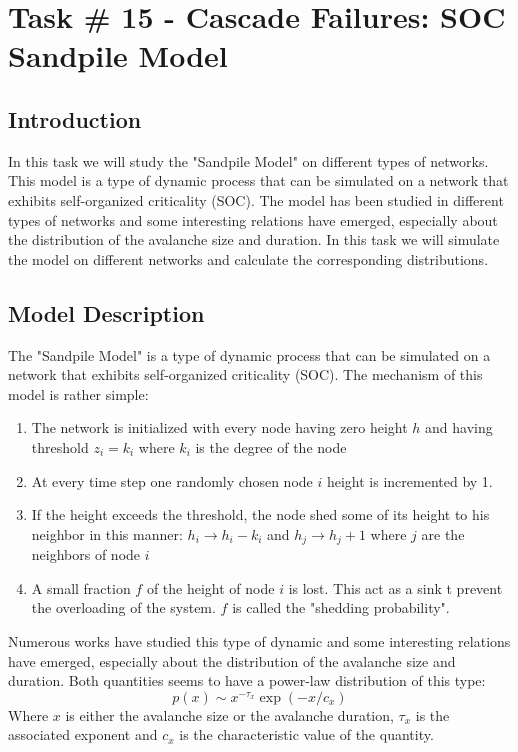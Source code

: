 \chapter{Task \# 15 - Cascade Failures: SOC Sandpile Model}

\section{Introduction}
In this task we will study the "Sandpile Model" on different types of networks. This model is a type of dynamic process that can be simulated on a network that exhibits self-organized criticality (SOC). The model has been studied in different types of networks and some interesting relations have emerged, especially about the distribution of the avalanche size and duration. In this task we will simulate the model on different networks and calculate the corresponding distributions.

\section{Model Description}

The "Sandpile Model" is a type of dynamic process that can be simulated on a network that exhibits self-organized criticality (SOC).
The mechanism of this model is rather simple:
\begin{enumerate}
    \item The network is initialized with every node having zero height $h$ and having threshold $z_i = k_i$ where $k_i$ is the degree of the node
    \item At every time step one randomly chosen node $i$ height is incremented by 1.
    \item If the height exceeds the threshold, the node shed some of its height to his neighbor in this manner: $h_i \rightarrow h_i - k_i$ and $h_j \rightarrow h_j + 1$ where $j$ are the neighbors of node $i$
    \item A small fraction $f$ of the height of node $i$ is lost. This act as a sink t prevent the overloading of the system. $f$ is called the "shedding probability".
\end{enumerate}

Numerous works have studied this type of dynamic and some interesting relations have emerged, especially about the distribution of the avalanche size and duration.
Both quantities seems to have a power-law distribution of this type:
$$p(x) \sim x^{-\tau_x}\exp{(-x/c_x)}$$
Where $x$ is either the avalanche size or the avalanche duration, $\tau_x$ is the associated exponent and $c_x$ is the characteristic value of the quantity. \cite{scale_free_sandpile}

